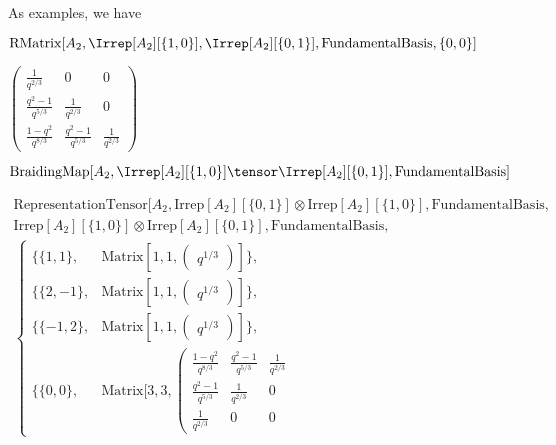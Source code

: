 As examples, we have



\begin{mma}
\begin{inm}$\text{RMatrix}[A_2, \Irrep[A_2][\{1,0\}], \Irrep[A_2][\{0,1\}], \text{FundamentalBasis}, \{0,0\}]$
\end{inm}
\begin{outm}$\left(\begin{array}{lll} \frac{1}{q^{2/3}} & 0 & 0 \\ \frac{q^2-1}{q^{5/3}} & \frac{1}{q^{2/3}} & 0 \\ \frac{1-q^2}{q^{8/3}} & \frac{q^2-1}{q^{5/3}} & \frac{1}{q^{2/3}}\end{array}\right)$\end{outm}
\begin{inm}$\text{BraidingMap}[A_2, \Irrep[A_2][\{1,0\}] \tensor \Irrep[A_2][\{0,1\}], \text{FundamentalBasis}]$
\end{inm}
\begin{outm}
\begin{equation*}
\begin{split}
\text{RepresentationTensor}[A_2,\text{Irrep}\left[A_2\right][\{0,1\}]\otimes
   \text{Irrep}\left[A_2\right][\{1,0\}],\text{FundamentalBasis}, \\
   \text{Irrep}\left[A_2\right][\{1,0\}]\otimes
   \text{Irrep}\left[A_2\right][\{0,1\}],\text{FundamentalBasis},\\
\left\{
\begin{array}{ll}
\{
 \{1,1\}, & \text{Matrix}\left[1,1,\left(
\begin{array}{l}
 q^{1/3}
\end{array}
\right)\right] \},\\\{
 \{2,-1\}, & \text{Matrix}\left[1,1,\left(
\begin{array}{l}
 q^{1/3}
\end{array}
\right)\right] \},\\\{
 \{-1,2\}, & \text{Matrix}\left[1,1,\left(
\begin{array}{l}
 q^{1/3}
\end{array}
\right)\right] \},\\\{
 \{0,0\}, & \text{Matrix}[3,3,\left(
\begin{array}{lll}
 \frac{1-q^2}{q^{8/3}} & \frac{q^2-1}{q^{5/3}} & \frac{1}{q^{2/3}} \\
 \frac{q^2-1}{q^{5/3}} & \frac{1}{q^{2/3}} & 0 \\
 \frac{1}{q^{2/3}} & 0 & 0
\end{array}

\end{array}
\end{split}
\end{equation*}
\end{outm}
\end{mma}
